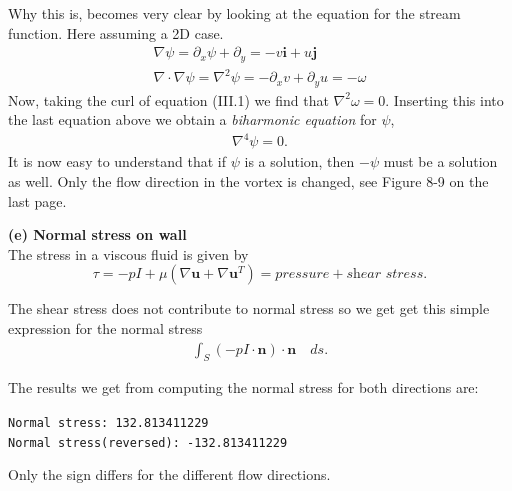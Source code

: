 \documentclass[11pt,a4paper,english]{article}
\numberwithin{equation}{section}
\begin{document}
Why this is, becomes very clear by looking at the equation for the stream function. Here assuming a 2D case.
\begin{align*}
\nabla \psi = \partial_x \psi + \partial_y = -v \mathbf{i} + u \mathbf{j} \\
\nabla \cdot \nabla \psi = \nabla^2 \psi = -\partial_x v + \partial_y u = -\omega 
\end{align*} 
Now, taking the curl of equation (III.1) we find that $\nabla^2 \omega= 0$. Inserting this into the last equation above we obtain a \emph{biharmonic equation} for $\psi$, 
\begin{align*}
\nabla^4 \psi = 0.
\end{align*} 
It is now easy to understand that if $\psi$ is a solution, then $-\psi$ must be a solution as well. Only the flow direction in the vortex is changed, see Figure  8-9 on the last page.  



\textbf{(e) Normal stress on wall} \\

The stress in a viscous fluid is given by 
\begin{equation}
\tau = -pI + \mu (\nabla \mathbf{u}  + \nabla \mathbf{u}^T  ) = pressure + \textit{shear stress}. 
\end{equation}

The shear stress does not contribute to normal stress so we get get this simple expression for the normal stress
\begin{align*}
\int_{S} (-p I \cdot \mathbf{n} ) \cdot \mathbf{n} \quad ds.
\end{align*}

The results we get from computing the normal stress for both directions are:

\texttt{Normal stress:  132.813411229} \\
\texttt{Normal stress(reversed):  -132.813411229 }

Only the sign differs for the different flow directions. 
\newpage
\end{document}

